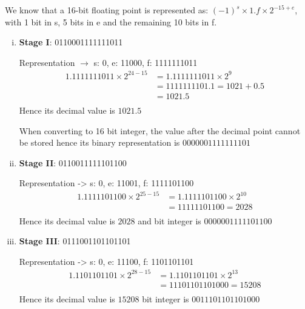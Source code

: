 \documentclass{article}
\begin{document}
We know that a 16-bit floating point is represented as:
$(-1)^s \times 1.f \times 2^{-15 + e}$, with 1 bit in s, 5 bits in e and the remaining 10 bits in f.

\begin{enumerate}[(i)]
\item\label{item:3c1} \textbf{Stage I}: 0110001111111011\newline

  Representation $\rightarrow$ s: 0, e: 11000, f: 1111111011
  \begin{align*}
    1.1111111011 \times 2^{24 - 15} &= 1.1111111011 \times 2^9\\
    &= 1111111101.1 = 1021 + 0.5\\
    &= 1021.5\\
  \end{align*}
  Hence its decimal value is $\boxed{1021.5}$\newline

  When converting to 16 bit integer, the value after the decimal point cannot be stored hence its binary representation is $\boxed{0000001111111101}$\newline\newline

\item\label{item:3c2} \textbf{Stage II}: 0110011111101100\newline

  Representation -> s: 0, e: 11001, f: 1111101100
  \begin{align*}
    1.1111101100 \times 2^{25 - 15} &= 1.1111101100 \times 2^{10}\\
    &= 11111101100 = 2028\\
  \end{align*}
  Hence its decimal value is $\boxed{2028}$ and  bit integer is $\boxed{0000001111101100}$\newline\newline

\item\label{item:3c3} \textbf{Stage III}: 0111001101101101\newline

  Representation -> s: 0, e: 11100, f: 1101101101
  \begin{align*}
    1.1101101101 \times 2^{28 - 15} &= 1.1101101101 \times 2^{13}\\
    &= 11101101101000 = 15208\\
  \end{align*}
  Hence its decimal value is $\boxed{15208}$ bit integer is $\boxed{0011101101101000}$\newline\newline


\end{enumerate}
\end{document}
